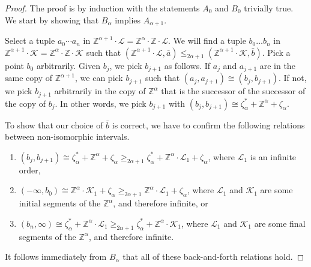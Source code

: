 \documentclass[10pt,a4paper]{amsart}
\newcommand{\K}{\mathcal{K}}
\renewcommand{\L}{\mathcal{L}}
\newcommand{\Z}{\mathbb{Z}}
\providecommand{\ba}{\bar a}
\providecommand{\bb}{\bar b}
\providecommand{\tightlist}{%
  \setlength{\itemsep}{0pt}\setlength{\parskip}{0pt}}
\begin{document}
\begin{proof}
    The proof is by induction with the statements $A_0$ and $B_0$ trivially true.
    We start by showing that $B_\alpha$ implies $A_{\alpha+1}$. 

    Select a tuple $a_0\cdots a_n$ in $\Z^{\alpha+1}\cdot \L=\Z^\alpha\cdot\Z\cdot
    \L$. We will find a tuple $b_0\dots b_n$ in $\Z^{\alpha+1}\cdot
    \K=\Z^\alpha\cdot\Z\cdot \K$ such that $(\Z^{\alpha+1}\cdot \L,\ba
    )\leq_{2\alpha+1} (\Z^{\alpha+1}\cdot \K,\bb)$. Pick a point $b_0$ arbitrarily.
    Given $b_j$, we pick $b_{j+1}$ as follows. If $a_j$ and $a_{j+1}$ are in the
    same copy of $\Z^{\alpha+1}$, we can pick $b_{j+1}$ such that
    $(a_j,a_{j+1})\cong(b_j,b_{j+1})$. If not, we pick $b_{j+1}$
    arbitrarily in the copy of $\Z^{\alpha}$ that is the successor of the successor
    of the copy of $b_j$. In other words, we pick $b_{j+1}$ with  $(b_j,b_{j+1})\cong \zeta^*_\alpha +\Z^\alpha+\zeta_\alpha$.
    
To show that our choice of $\bb$ is correct, we have to confirm the following
relations between non-isomorphic intervals.
\begin{enumerate}\tightlist
\item $(b_j,b_{j+1})\cong \zeta^*_\alpha +\Z^\alpha+\zeta_\alpha \geq_{2\alpha+1} \zeta^*_\alpha
    +\Z^\alpha\cdot \L_1+\zeta_\alpha$, where $\L_1$ is an infinite order,
\item $(-\infty,b_0)\cong \Z^\alpha\cdot \K_1+\zeta_\alpha \geq_{2\alpha+1}\Z^\alpha\cdot
    \L_1+\zeta_\alpha$, where $\L_1$ and $\K_1$ are some initial segments of the $\Z^\alpha$, and therefore infinite, or
\item $(b_{n},\infty)\cong\zeta^*_\alpha +\Z^\alpha\cdot \L_1 \geq_{2\alpha+1} \zeta^*_\alpha
    +\Z^\alpha\cdot \K_1$, where $\L_1$ and $\K_1$ are some final segments of the $\Z^\alpha$, and therefore infinite.
\end{enumerate} 
It follows immediately from $B_\alpha$ that all of these back-and-forth relations hold.


\end{proof}
\end{document}
